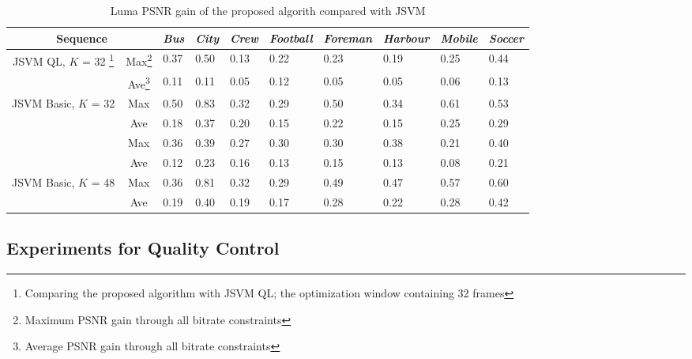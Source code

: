\documentclass[journal]{IEEEtran}
\begin{document}
\begin{table}[t]
\centering
\caption{Luma PSNR gain of the proposed algorith compared with JSVM}
\label{tab:extraction-gain}
\begin{minipage}{0.95\linewidth}
\centering
\begin{tabular}{c|c|p{1.2cm}<{\centering}|p{1.2cm}<{\centering}|p{1.2cm}<{\centering}|p{1.2cm}<{\centering}| 
p{1.2cm}<{\centering}|p{1.2cm}<{\centering}|p{1.2cm}<{\centering}|p{1.2cm}<{\centering}}
\hline \hline
\multicolumn{2}{c|}{Sequence} &
{\em Bus} & {\em City} & {\em Crew} & {\em Football} & {\em Foreman} & {\em Harbour} & {\em Mobile} & {\em Soccer} \\ \hline 
\multirow{2}{*}{JSVM QL, $K$ = 32 \footnote{\label{footnote:JSVM_QL} Comparing the proposed algorithm with JSVM QL; the optimization window containing 32 frames}}
& Max\footnote{\label{footnote:max} Maximum PSNR gain through all bitrate constraints}
& 0.37 & 0.50 & 0.13 & 0.22 & 0.23 & 0.19 & 0.25 & 0.44 \\ \cline{2-10}
& Ave\footnote{\label{footnote:ave} Average PSNR gain through all bitrate constraints}
& 0.11 & 0.11 & 0.05 & 0.12 & 0.05 & 0.05 & 0.06 & 0.13 \\ \hline
\multirow{2}{*}{JSVM Basic, $K$ = 32}
& Max & 0.50 & 0.83 & 0.32 & 0.29 & 0.50 & 0.34 & 0.61 & 0.53 \\ \cline{2-10}
& Ave & 0.18 & 0.37 & 0.20 & 0.15 & 0.22 & 0.15 & 0.25 & 0.29 \\ \Xhline{2\arrayrulewidth}
\multirow{2}{*}{JSVM QL, $K$ = 48}
& Max & 0.36 & 0.39 & 0.27 & 0.30 & 0.30 & 0.38 & 0.21 & 0.40 \\ \cline{2-10}
& Ave & 0.12 & 0.23 & 0.16 & 0.13 & 0.15 & 0.13 & 0.08 & 0.21 \\ \hline
\multirow{2}{*}{JSVM Basic, $K$ = 48}
& Max & 0.36 & 0.81 & 0.32 & 0.29 & 0.49 & 0.47 & 0.57 & 0.60 \\ \cline{2-10}
& Ave & 0.19 & 0.40 & 0.19 & 0.17 & 0.28 & 0.22 & 0.28 & 0.42 \\ \hline
\end{tabular}
\end{minipage}
\end{table}

\subsection{Experiments for Quality Control}
\label{subsec:exp-control}
\end{document}
